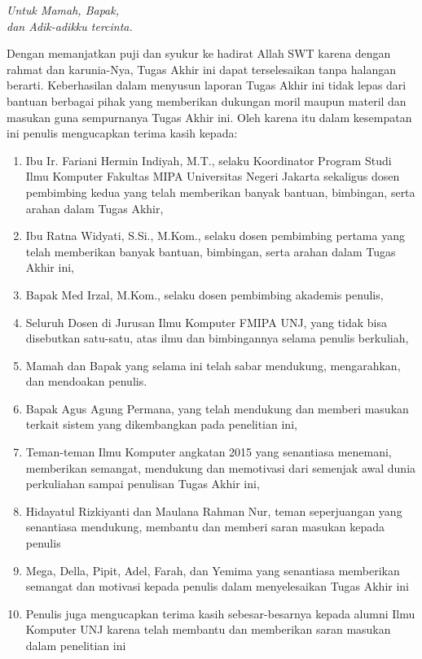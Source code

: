 \documentclass{jtetiskripsi}
\begin{document}
\cover


%


\acknowledgment
\begin{flushright}
	\emph{Untuk Mamah, Bapak,\\dan Adik-adikku tercinta.}
\end{flushright}

\preface
\vspace{0.5cm}
Dengan memanjatkan puji dan syukur ke hadirat Allah SWT karena dengan rahmat dan karunia-Nya, Tugas Akhir ini dapat terselesaikan tanpa halangan berarti. Keberhasilan dalam menyusun laporan Tugas Akhir ini tidak lepas dari bantuan berbagai pihak yang memberikan dukungan moril maupun materil dan masukan guna sempurnanya Tugas Akhir ini. Oleh karena itu dalam kesempatan ini penulis mengucapkan terima kasih kepada:

\begin{enumerate}
	\item{Ibu Ir. Fariani Hermin Indiyah, M.T., selaku Koordinator Program Studi Ilmu Komputer Fakultas MIPA Universitas Negeri Jakarta sekaligus dosen pembimbing kedua yang telah memberikan banyak bantuan, bimbingan, serta arahan dalam Tugas Akhir,}
	\item{Ibu Ratna Widyati, S.Si., M.Kom., selaku dosen pembimbing pertama yang telah memberikan banyak bantuan, bimbingan, serta arahan dalam Tugas Akhir ini,}
	\item{Bapak Med Irzal, M.Kom., selaku dosen pembimbing akademis penulis,}
	\item{Seluruh Dosen di Jurusan Ilmu Komputer FMIPA UNJ, yang tidak bisa disebutkan satu-satu, atas ilmu dan bimbingannya selama penulis berkuliah,}
	\item{Mamah dan Bapak yang selama ini telah sabar mendukung, mengarahkan, dan mendoakan penulis.}
	\item{Bapak Agus Agung Permana, yang telah mendukung dan memberi masukan terkait sistem yang dikembangkan pada penelitian ini,}
	\item{Teman-teman Ilmu Komputer angkatan 2015 yang senantiasa menemani, memberikan semangat, mendukung dan memotivasi dari semenjak awal dunia perkuliahan sampai penulisan Tugas Akhir ini,}
	\item{Hidayatul Rizkiyanti dan Maulana Rahman Nur, teman seperjuangan yang senantiasa mendukung, membantu dan memberi saran masukan kepada penulis}
	\item {Mega, Della, Pipit, Adel, Farah, dan Yemima yang senantiasa memberikan semangat dan motivasi kepada penulis dalam menyelesaikan Tugas Akhir ini}
	\item{Penulis juga mengucapkan terima kasih sebesar-besarnya kepada alumni Ilmu Komputer UNJ karena telah membantu dan memberikan saran masukan dalam penelitian ini}
\end{enumerate}
\end{document}
